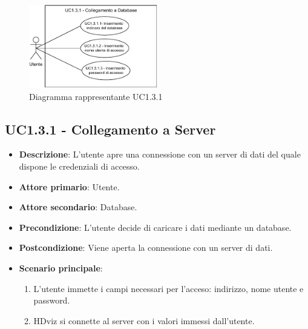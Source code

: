 \newpage
\begin{figure}[h]
    \centering
    \includegraphics[width=0.5\textwidth]{componenti/casi-duso/diagrammi/UC1_3_1.pdf}
    \caption{Diagramma rappresentante UC1.3.1}
    \label{fig:UC1.3}
\end{figure}


\subsection{UC1.3.1 - Collegamento a Server}
\label{subsec:UC1.3.1}
\begin{itemize}
    \item \textbf{Descrizione}: L'utente apre una connessione con un server di dati del quale 
                                dispone le credenziali di accesso. 

    \item \textbf{Attore primario}: Utente.
    \item \textbf{Attore secondario}: Database.
    
    \item \textbf{Precondizione}:   L'utente decide di caricare i dati mediante un database.
    \item \textbf{Postcondizione}:  Viene aperta la connessione con un server di dati.

	\item \textbf{Scenario principale}:
		\begin{enumerate}
			\item L'utente immette i campi necessari per l'acceso: indirizzo, nome utente e password.
			\item HDviz si connette al server con i valori immessi dall'utente.
        \end{enumerate}
    \end{itemize}


